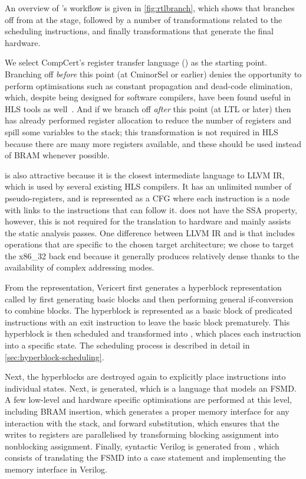 An overview of \vericert{}'s workflow is given in \cref{fig:rtlbranch}, which
shows that \vericert{} branches off from \compcert{} at the \rtl{} stage,
followed by a number of transformations related to the scheduling instructions,
and finally transformations that generate the final hardware.

We select CompCert's register transfer language (\rtl{}) as the starting
point. Branching off \emph{before} this point (at CminorSel or earlier) denies
\compcert{} the opportunity to perform optimisations such as constant
propagation and dead-code elimination, which, despite being designed for
software compilers, have been found useful in HLS tools as
well~\cite{cong11_high_level_synth_fpgas}. And if we branch off \emph{after}
this point (at LTL or later) then \compcert{} has already performed register
allocation to reduce the number of registers and spill some variables to the
stack; this transformation is not required in HLS because there are many more
registers available, and these should be used instead of \gls{BRAM} whenever
possible.

\rtl{} is also attractive because it is the closest intermediate language to
LLVM \gls{IR}, which is used by several existing HLS compilers.  It has an
unlimited number of pseudo-registers, and is represented as a \gls{CFG} where
each instruction is a node with links to the instructions that can follow it.
\rtl{} does not have the SSA property, however, this is not required for the
translation to hardware and mainly assists the static analysis passes.  One
difference between LLVM \gls{IR} and \rtl{} is that \rtl{} includes operations
that are specific to the chosen target architecture; we chose to target the
x86\_32 back end because it generally produces relatively dense \rtl{} thanks to
the availability of complex addressing modes.

From the \rtl{} representation, Vericert first generates a hyperblock
representation called \rtlblock{} by first generating basic blocks and then
performing general if-conversion to combine blocks.  The hyperblock is
represented as a basic block of predicated instructions with an exit instruction
to leave the basic block prematurely.  This hyperblock is then scheduled and
transformed into \rtlpar{}, which places each instruction into a specific state.
The scheduling process is described in detail in
\cref{sec:hyperblock-scheduling}.

Next, the hyperblocks are destroyed again to explicitly place instructions into
individual states.  Next, \htl{} is generated, which is a language that models
an \gls{FSMD}.  A few low-level and hardware specific optimisations are
performed at this level, including \gls{BRAM} insertion, which generates a
proper memory interface for any interaction with the stack, and forward
substitution, which ensures that the writes to registers are parallelised by
transforming blocking assignment into nonblocking assignment.  Finally,
syntactic Verilog is generated from \htl{}, which consists of translating the
\gls{FSMD} into a case statement and implementing the memory interface in
Verilog.

